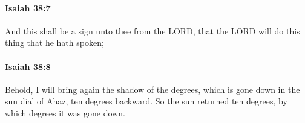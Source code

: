 		\paragraph{Isaiah 38:7} %
			\label{ISAIAH-38-7}

			And this shall be a sign unto thee from the LORD, that the LORD will do this thing that he hath spoken;


		\paragraph{Isaiah 38:8} %
			\label{ISAIAH-38-8}

			Behold, I will bring again the shadow of the degrees, which is gone down in the sun dial of Ahaz, ten degrees backward. So the sun returned ten degrees, by which degrees it was gone down.


